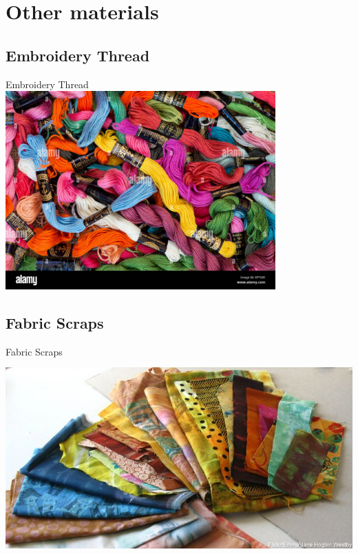 \documentclass{beamer}
\begin{document}
\section{Other materials}
\frame{\tableofcontents[hideothersubsections,sectionstyle=show/hide]}
\subsection{Embroidery Thread}
\begin{frame}[fragile]{Embroidery Thread}
\includegraphics[height=3in]{embroiderythreads.jpg}
\end{frame}
\subsection{Fabric Scraps}
\begin{frame}[fragile]{Fabric Scraps}
\includegraphics[height=3in]{FabricScraps.jpg}
\end{frame}
\end{document}

